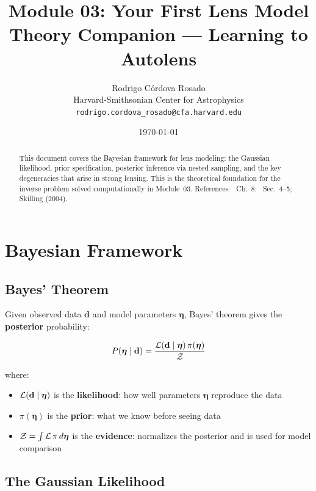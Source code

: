 \documentclass[11pt, letterpaper]{article}
\title{\textbf{Module 03: Your First Lens Model}\\[0.5em]
\large Theory Companion — Learning to Autolens}
\author{Rodrigo C\'ordova Rosado\\
\small Harvard-Smithsonian Center for Astrophysics\\
\small \texttt{rodrigo.cordova\_rosado@cfa.harvard.edu}}
\date{\today}
\begin{document}
\maketitle

\begin{abstract}
This document covers the Bayesian framework for lens modeling: the
Gaussian likelihood, prior specification, posterior inference via nested
sampling, and the key degeneracies that arise in strong lensing. This
is the theoretical foundation for the inverse problem solved
computationally in Module~03.
References: \CK\ Ch.~8; \Night\ Sec.~4--5; Skilling (2004).
\end{abstract}

\tableofcontents
\newpage

\section{Bayesian Framework}
\label{sec:bayes}

\subsection{Bayes' Theorem}

Given observed data $\mathbf{d}$ and model parameters $\bm{\eta}$,
Bayes' theorem gives the \textbf{posterior} probability:

\begin{keyresult}
\begin{equation}
P(\bm{\eta} \mid \mathbf{d}) = \frac{\mathcal{L}(\mathbf{d} \mid \bm{\eta})\,\pi(\bm{\eta})}{\mathcal{Z}}
\label{eq:bayes}
\end{equation}
\end{keyresult}

\noindent where:
\begin{itemize}[nosep]
  \item $\mathcal{L}(\mathbf{d} \mid \bm{\eta})$ is the \textbf{likelihood}:
    how well parameters $\bm{\eta}$ reproduce the data
  \item $\pi(\bm{\eta})$ is the \textbf{prior}: what we know before
    seeing data
  \item $\mathcal{Z} = \int \mathcal{L} \, \pi \, d\bm{\eta}$ is the
    \textbf{evidence}: normalizes the posterior and is used for model
    comparison
\end{itemize}

\subsection{The Gaussian Likelihood}
\end{document}
